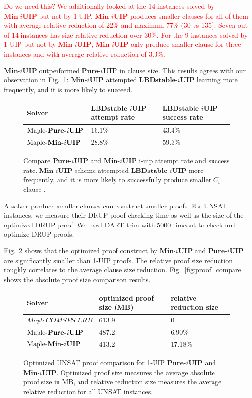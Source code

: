 \documentclass[runningheads]{llncs}
\newcommand{\iUIPClause}{\ensuremath{C_{i}}}
\newcommand{\IUIP}{\textbf{LBDstable-$i$UIP}}
\newcommand{\IUIPPURE}{\textbf{Pure-$i$UIP}}
\newcommand{\IUIPMIN}{\textbf{Min-$i$UIP}}
\newcommand{\MapleBase}{\textit{MapleCOMSPS\_LRB}}
\newcommand{\MapleIUIPPURE}{\text{Maple-\IUIPPURE}}
\newcommand{\MapleIUIMIN}{\text{Maple-\IUIPMIN}}
\newcommand{\nf}[1]{\textcolor{red}{#1}}
\begin{document}
\nf{ Do we need this?  We additionally looked at the 14 instances
  solved by $\IUIPMIN$ but not by 1-UIP. $\IUIPMIN$ produces smaller
  clauses for all of them with average relative reduction of 22\% and
  maximum 77\% (30 vs 135). Seven out of 14 instances has size
  relative reduction over 30\%. For the 9 instances solved by 1-UIP
  but not by $\IUIPMIN$, $\IUIPMIN$ only produce smaller clause for
  three instances and with average relative reduction of 3.3\%.}

$\IUIPMIN$ outperformed $\IUIPPURE$ in clause size.  This results agrees with our observation in Fig.~\ref{fig:t2}: $\IUIPMIN$ attempted $\IUIP$ learning more frequently, and it is more likely to succeed.  

\begin{figure} 
\begin{center} 
\begin{tabular}{ | m{3.5cm} | m{5cm}| m{3.5cm} | } 
\hline
Solver & $\IUIP$ attempt rate & $\IUIP$ success rate  \\ 
\hline
$\MapleIUIPPURE$ & 16.1\% & 43.4\% \\ 
\hline
$\MapleIUIMIN$ & 28.8\% & 59.3\% \\ 
\hline
\end{tabular}
\end{center}
\caption{Compare $\IUIPPURE$ and $\IUIPMIN$ i-uip attempt rate and success rate. $\IUIPMIN$ scheme attempted $\IUIP$ more frequently, and it is more likely to successfully produce smaller $\iUIPClause$ clause .}
\label{fig:t2}
\end{figure}

A solver produce smaller clauses can construct smaller proofs. For
UNSAT instances, we measure their DRUP\cite{} proof checking time as
well as the size of the optimized DRUP proof. We used DART-trim
\cite{} with 5000 timeout to check and optimize DRUP proofs.

Fig.~\ref{fig:t3} shows that the optimized proof construct by
$\IUIPMIN$ and $\IUIPPURE$ are significantly smaller than 1-UIP
proofs. The relative proof size reduction roughly correlates to the
average clause size reduction. Fig.~\ref{fig:proof_compare} shows the
absolute proof size comparison results.

\begin{figure} 
\begin{center} 
\begin{tabular}{ | m{3.5cm} | m{5cm}| m{3.5cm} | } 
\hline
Solver & optimized proof size (MB) & relative reduction size  \\ 
\hline
$\MapleBase$ & 613.9 & 0  \\ 
\hline
$\MapleIUIPPURE$ & 487.2 & 6.90\% \\ 
\hline
$\MapleIUIMIN$ & 413.2 & 17.18\% \\ 
\hline
\end{tabular}
\end{center}
\caption{Optimized UNSAT proof comparison for 1-UIP $\IUIPPURE$ and $\IUIPMIN$. Optimized proof size measures the average absolute proof size in MB, and relative reduction size measures the average relative reduction for all UNSAT instances.}
\label{fig:t3}
\end{figure}
\end{document}
